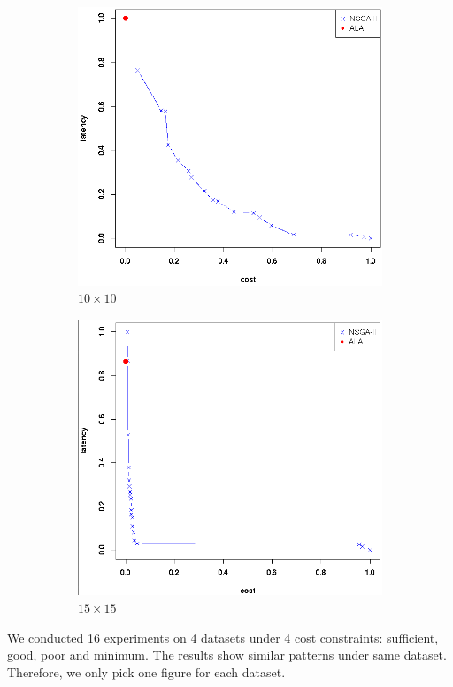 \documentclass[twoside]{article}
\begin{document}
\begin{figure}[H]
	\begin{subfigure}[b]{0.4\textwidth}
		\includegraphics[width=\textwidth]{pics/111.png}
		\caption{$10 \times 10$}
		\label{fig:10_10}
	\end{subfigure}
	\begin{subfigure}[b]{0.4\textwidth}
		\includegraphics[width=\textwidth]{pics/112.png}
		\caption{$15 \times 15$}
		\label{fig:15_15}
	\end{subfigure}

	\caption{}\label{fig:condition}
\end{figure}
We conducted 16 experiments on 4 datasets under 4 cost constraints: sufficient, good, poor and minimum. The results show similar 
patterns under same dataset. Therefore, we only pick one figure for each dataset.
\end{document}
